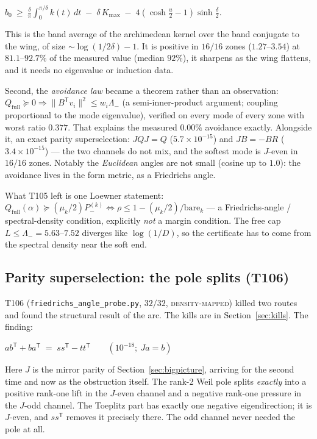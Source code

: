 \documentclass[11pt,a4paper]{article}
\newcommand{\Qfull}{Q_{\mathrm{full}}}
\begin{document}
\begin{keyeq}$\displaystyle
b_0\ \ge\ \frac{\delta}{\pi}\int_0^{\pi/\delta}\!\!k(t)\,dt\;-\;\delta\,K_{\max}\;-\;4\left(\cosh\tfrac u2-1\right)\sinh\tfrac\delta2 .$\end{keyeq}

\noindent This is the band average of the archimedean kernel over the band conjugate to the wing, of
size ${\sim}\log(1/2\delta)-1$. It is positive in $16/16$ zones ($1.27$--$3.54$) at $81.1$--$92.7\%$ of
the measured value (median $92\%$), it sharpens as the wing flattens, and it needs no eigenvalue or
induction data.

Second, the \emph{avoidance law} became a theorem rather than an observation:
$\Qfull\succeq0\Rightarrow\|B^{\mathsf T}v_i\|^2\le w_i\Lambda_-$ (a semi-inner-product argument;
coupling proportional to the mode eigenvalue), verified on every mode of every zone with worst ratio
$0.377$. That explains the measured $0.00\%$ avoidance exactly. Alongside it, an exact parity
superselection: $JQJ=Q$ ($5.7\times10^{-15}$) and $JB=-BR$ ($3.4\times10^{-15}$) --- the two channels do
not mix, and the softest mode is $J$-even in $16/16$ zones. Notably the \emph{Euclidean} angles are not
small (cosine up to $1.0$): the avoidance lives in the form metric, as a Friedrichs angle.

What T105 left is one Loewner statement:
$\Qfull(\alpha)\succeq(\mu_k/2)P_-^{(k)}\iff\rho\le1-(\mu_k/2)/\mathrm{bare}_k$ --- a Friedrichs-angle /
spectral-density condition, explicitly \emph{not} a margin condition. The free cap
$L\le\Lambda_-=5.63$--$7.52$ diverges like $\log(1/D)$, so the certificate has to come from the spectral
density near the soft end.

\subsection{Parity superselection: the pole splits (T106)}
T106 (\texttt{friedrichs\_angle\_probe.py}, $32/32$, \textsc{density-mapped}) killed two routes and
found the structural result of the arc. The kills are in Section~\ref{sec:kills}. The finding:

\begin{keyeq}$\displaystyle
ab^{\mathsf T}+ba^{\mathsf T}\;=\;ss^{\mathsf T}-tt^{\mathsf T}\qquad(10^{-18};\ Ja=b)$\end{keyeq}

\noindent Here $J$ is the mirror parity of Section~\ref{sec:bigpicture}, arriving for the second time
and now as the obstruction itself. The rank-2 Weil pole splits \emph{exactly} into a positive rank-one lift in the $J$-even
channel and a negative rank-one pressure in the $J$-odd channel. The Toeplitz part has exactly one
negative eigendirection; it is $J$-even, and $ss^{\mathsf T}$ removes it precisely there. The odd
channel never needed the pole at all.
\end{document}
